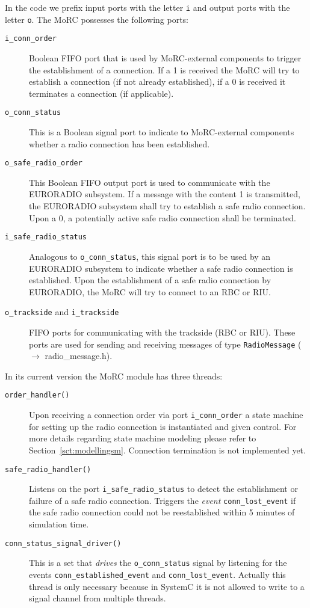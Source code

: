 \documentclass{template/openetcs_article}
\begin{document}
In the code we prefix input ports with the letter \verb|i| and output ports with the letter \verb|o|. The MoRC possesses the following ports:
\begin{description}
  \item[\tt i\_conn\_order] Boolean FIFO port that is used by MoRC-external components to trigger the establishment of a connection. If a 1 is received the MoRC will try to establish a connection (if not already established), if a 0 is received it terminates a connection (if applicable).
  \item[\tt o\_conn\_status] This is a Boolean signal port to indicate to MoRC-external components whether a radio connection has been established.
  \item[\tt o\_safe\_radio\_order] This Boolean FIFO output port is used to communicate with the EURORADIO subsystem. If a message with the content 1 is transmitted, the EURORADIO subsystem shall try to establish a safe radio connection. Upon a 0, a potentially active safe radio connection shall be terminated.
  \item[\tt i\_safe\_radio\_status] Analogous to \texttt{o\_conn\_status}, this signal port is to be used by an EURORADIO subsystem to indicate whether a safe radio connection is established. Upon the establishment of a safe radio connection by EURORADIO, the MoRC will try to connect to an RBC or RIU.
  \item[{\tt o\_trackside} {\rm and }{\tt i\_trackside}] FIFO ports for communicating with the trackside (RBC or RIU). These ports are used for sending and receiving messages of type \verb|RadioMessage| ($\rightarrow$ radio\_message.h).
\end{description}

In its current version the MoRC module has three threads:
\begin{description}
  \item[\tt order\_handler()] Upon receiving a connection order via port \texttt{i\_conn\_order} a state machine for setting up the radio connection is instantiated and given control. For more details regarding state machine modeling please refer to Section~\ref{sct:modellingsm}. Connection termination is not implemented yet.
  \item[\tt safe\_radio\_handler()] Listens on the port \texttt{i\_safe\_radio\_status} to detect the establishment or failure of a safe radio connection. Triggers the \emph{event} \verb|conn_lost_event| if the safe radio connection could not be reestablished within 5 minutes of simulation time.
  \item[\tt conn\_status\_signal\_driver()] This is a set that \emph{drives} the \texttt{o\_conn\_status} signal by listening for the events \verb|conn_established_event| and \verb|conn_lost_event|. Actually this thread is only necessary because in SystemC it is not allowed to write to a signal channel from multiple threads.
\end{description}
\end{document}
